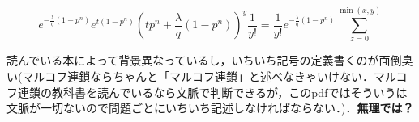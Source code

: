 \documentclass[12pt, a4paper]{jsarticle}
\theoremstyle{definition}
\begin{document}
\section{}
\[
e^{-\frac{\lambda}{q}(1-p^n)}e^{t(1-p^n)} \left(tp^n + \frac{\lambda}{q}(1-p^n) \right) ^y \frac{1}{y!}= \frac{1}{y!} e^{-\frac{\lambda}{q}(1-p^n)} \sum_{z=0}^{\min(x,y)} 
\]	

読んでいる本によって背景異なっているし，いちいち記号の定義書くのが面倒臭い(マルコフ連鎖ならちゃんと「マルコフ連鎖」と述べなきゃいけない．マルコフ連鎖の教科書を読んでいるなら文脈で判断できるが，このpdfではそういうは文脈が一切ないので問題ごとにいちいち記述しなければならない．)．{\bf 無理では？}
\end{document}
